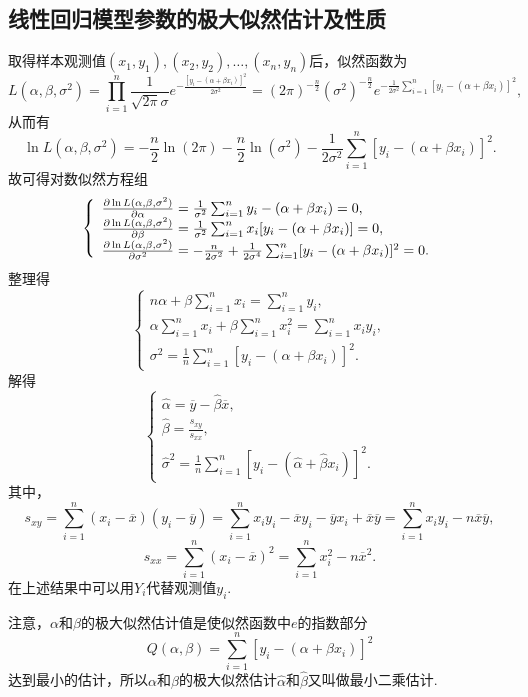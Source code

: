 \subsection{线性回归模型参数的极大似然估计及性质}
取得样本观测值\((x_1,y_1),(x_2,y_2),\dotsc,(x_n,y_n)\)后，似然函数为\[
L(\alpha,\beta,\sigma^2)
= \prod_{i=1}^n{ \frac{1}{\sqrt{2\pi}\sigma} e^{ -\frac{[y_i - (\alpha+\beta x_i)]^2}{2\sigma^2} } }
= (2\pi)^{-\frac{n}{2}} (\sigma^2)^{-\frac{n}{2}} e^{ -\frac{1}{2\sigma^2} \sum_{i=1}^n[y_i - (\alpha+\beta x_i)]^2 },
\]从而有\[
\ln L(\alpha,\beta,\sigma^2)
= -\frac{n}{2} \ln(2\pi) - \frac{n}{2} \ln(\sigma^2) - \frac{1}{2\sigma^2} \sum_{i=1}^n[y_i-(\alpha+\beta x_i)]^2.
\]故可得对数似然方程组\[
\left\{ \begin{array}{l}
\pdv{\ln L(\alpha,\beta,\sigma^2)}{\alpha}
= \frac{1}{\sigma^2} \sum_{i=1}^n{y_i-(\alpha+\beta x_i)} = 0, \\
\pdv{\ln L(\alpha,\beta,\sigma^2)}{\beta}
= \frac{1}{\sigma^2} \sum_{i=1}^n{x_i[y_i-(\alpha+\beta x_i)]} = 0, \\
\pdv{\ln L(\alpha,\beta,\sigma^2)}{\sigma^2}
= -\frac{n}{2\sigma^2} + \frac{1}{2\sigma^4} \sum_{i=1}^n[y_i-(\alpha+\beta x_i)]^2 = 0.
\end{array} \right.
\]整理得\[
\left\{ \begin{array}{l}
n \alpha + \beta \sum_{i=1}^n{x_i} = \sum_{i=1}^n{y_i}, \\
\alpha \sum_{i=1}^n{x_i} + \beta \sum_{i=1}^n{x_i^2} = \sum_{i=1}^n{x_i y_i}, \\
\sigma^2 = \frac{1}{n} \sum_{i=1}^n[y_i - (\alpha+\beta x_i)]^2.
\end{array} \right.
\]解得\[
\left\{ \begin{array}{l}
\hat{\alpha} = \overline{y} - \hat{\beta} \overline{x}, \\
\hat{\beta} = \frac{s_{xy}}{s_{xx}}, \\
\hat{\sigma}^2 = \frac{1}{n} \sum_{i=1}^n[y_i - (\hat{\alpha}+\hat{\beta}x_i)]^2.
\end{array} \right.
\]其中，\[
s_{xy} = \sum_{i=1}^n(x_i-\overline{x})(y_i-\overline{y})
= \sum_{i=1}^n{x_i y_i - \overline{x}y_i - \overline{y}x_i + \overline{x}\overline{y}}
= \sum_{i=1}^n{x_i y_i - n \overline{x} \overline{y}},
\]\[
s_{xx} = \sum_{i=1}^n(x_i - \overline{x})^2
= \sum_{i=1}^n{x_i^2 - n \overline{x}^2}.
\]
在上述结果中可以用\(Y_i\)代替观测值\(y_i\).

注意，\(\alpha\)和\(\beta\)的极大似然估计值是使似然函数中\(e\)的指数部分\[
Q(\alpha,\beta) = \sum_{i=1}^n[y_i-(\alpha+\beta x_i)]^2
\]达到最小的估计，所以\(\alpha\)和\(\beta\)的极大似然估计\(\hat{\alpha}\)和\(\hat{\beta}\)又叫做最小二乘估计.

